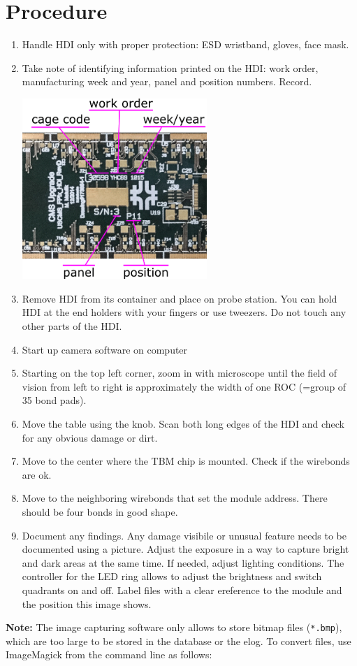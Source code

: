 \documentclass[12pt]{unlsilabsop}
\begin{document}
\section{Procedure}

\begin{enumerate}
    \item Handle HDI only with proper protection: ESD wristband, gloves, face mask.
    \item Take note of identifying information printed on the HDI: work order, manufacturing week and year, panel and position numbers. Record.

    \begin{center}
        \includegraphics[width=7cm]{img/HDIRevD_id.png}
    \end{center}

    \item Remove HDI from its container and place on probe station. You can hold HDI at the end holders with your fingers or use tweezers. Do not touch any other parts of the HDI.
    \item Start up camera software on computer
    \item Starting on the top left corner, zoom in with microscope until the field of vision from left to right is approximately the width of one ROC (=group of 35 bond pads).
    \item Move the table using the knob. Scan both long edges of the HDI and check for any obvious damage or dirt.
    \item Move to the center where the TBM chip is mounted. Check if the wirebonds are ok.
    \item Move to the neighboring wirebonds that set the module address. There should be four bonds in good shape.
    \item Document any findings. Any damage visibile or unusual feature needs to be documented using a picture. Adjust the exposure in a way to capture bright and dark areas at the same time. If needed, adjust lighting conditions. The controller for the LED ring allows to adjust the brightness and switch quadrants on and off. Label files with a clear ereference to the module and the position this image shows.
\end{enumerate}
\textbf{Note:} The image capturing software only allows to store bitmap files (\texttt{*.bmp}), which are too large to be stored in the database or the elog. To convert files, use ImageMagick from the command line as follows:
\end{document}
